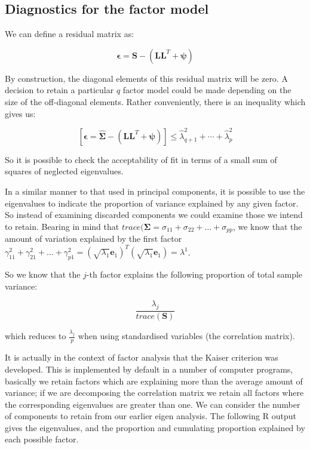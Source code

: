 \subsection{Diagnostics for the factor model}

We can define a residual matrix as:

\begin{equation}
\boldsymbol{\epsilon} = \boldsymbol{{S}} - \left(\boldsymbol{L}\boldsymbol{L}^{T} + \boldsymbol{\psi} \right)
\end{equation}

By construction, the diagonal elements of this residual matrix will be zero.   A decision to retain a particular $q$ factor model could be made depending on the size of the off-diagonal elements.   Rather conveniently, there is an inequality which gives us:

\begin{equation}
\left[ \boldsymbol{\epsilon} = \boldsymbol{\hat{\Sigma}} - \left(\boldsymbol{L}\boldsymbol{L}^{T} + \boldsymbol{\psi} \right) \right] \leq \hat{\lambda}_{q+1}^{2} + \cdots + \hat{\lambda}_{p}^{2}
\end{equation}

So it is possible to check the acceptability of fit in terms of a small sum of squares of neglected eigenvalues.

In a similar manner to that used in principal components, it is possible to use the eigenvalues to indicate the proportion of variance explained by any given factor.   So instead of examining discarded components we could examine those we intend to retain.   Bearing in mind that $trace(\boldsymbol{\Sigma} = \sigma_{11} + \sigma_{22} + \ldots + \sigma_{pp}$, we know that the amount of variation explained by the first factor $\gamma_{11}^{2} + \gamma_{21}^{2} + \ldots + \gamma_{p1}^{2} = (\sqrt{\lambda_{1}} \boldsymbol{e}_{1})^{T}(\sqrt{\lambda_{1}} \boldsymbol{e}_{1}) = \lambda^{1}$.

So we know that the $j$-th factor explains the following proportion of total sample variance:

\begin{equation}
\frac{\lambda_{j}}{trace(\boldsymbol{S})}
\end{equation}

which reduces to $\frac{\lambda_{j}}{p}$ when using standardised variables (the correlation matrix).

It is actually in the context of factor analysis that the Kaiser criterion was developed.   This is implemented by default in a number of computer programs, basically we retain factors which are explaining more than the average amount of variance; if we are decomposing the correlation matrix we retain all factors where the corresponding eigenvalues are greater than one.   We can consider the number of components to retain from our earlier eigen analysis.   The following R output gives the eigenvalues, and the proportion and cumulating proportion explained by each possible factor.

